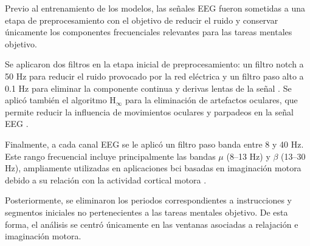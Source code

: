 Previo al entrenamiento de los modelos, las señales EEG fueron sometidas a una etapa de preprocesamiento con el objetivo de reducir el ruido y conservar únicamente los componentes frecuenciales relevantes para las tareas mentales objetivo.

Se aplicaron dos filtros en la etapa inicial de preprocesamiento: un filtro notch a 50 Hz para reducir el ruido provocado por la red eléctrica y un filtro paso alto a 0.1 Hz para eliminar la componente continua y derivas lentas de la señal \cite{ferrero_BMIBased2021}. Se aplicó también el algoritmo H\(_\infty\) para la eliminación de artefactos oculares, que permite reducir la influencia de movimientos oculares y parpadeos en la señal EEG \cite{kilicarslan_RobustAdaptive2016}.

Finalmente, a cada canal EEG se le aplicó un filtro paso banda entre 8 y 40 Hz. Este rango frecuencial incluye principalmente las bandas \(\mu\) (8--13 Hz) y \(\beta\) (13--30 Hz), ampliamente utilizadas en aplicaciones \acrshort{bci} basadas en imaginación motora debido a su relación con la actividad cortical motora \cite{mirnaziri_UsingCombination2013}.

Posteriormente, se eliminaron los periodos correspondientes a instrucciones y segmentos iniciales no pertenecientes a las tareas mentales objetivo. De esta forma, el análisis se centró únicamente en las ventanas asociadas a relajación e imaginación motora.